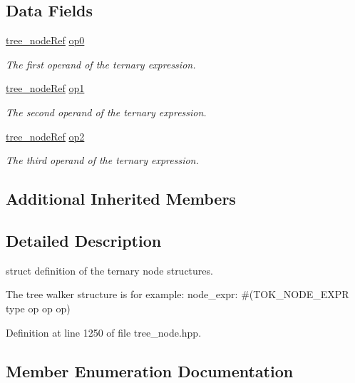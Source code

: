 \subsection*{Data Fields}
\begin{DoxyCompactItemize}
\item 
\hyperlink{tree__node_8hpp_a6ee377554d1c4871ad66a337eaa67fd5}{tree\+\_\+node\+Ref} \hyperlink{structternary__expr_a84c7843e200270533e0f6d919afd04c2}{op0}
\begin{DoxyCompactList}\small\item\em The first operand of the ternary expression. \end{DoxyCompactList}\item 
\hyperlink{tree__node_8hpp_a6ee377554d1c4871ad66a337eaa67fd5}{tree\+\_\+node\+Ref} \hyperlink{structternary__expr_ad67e5b5fdfe02673e426a8f9cc743ed3}{op1}
\begin{DoxyCompactList}\small\item\em The second operand of the ternary expression. \end{DoxyCompactList}\item 
\hyperlink{tree__node_8hpp_a6ee377554d1c4871ad66a337eaa67fd5}{tree\+\_\+node\+Ref} \hyperlink{structternary__expr_a55f515fdd2b6a3c150dfcfb4506a43ca}{op2}
\begin{DoxyCompactList}\small\item\em The third operand of the ternary expression. \end{DoxyCompactList}\end{DoxyCompactItemize}
\subsection*{Additional Inherited Members}


\subsection{Detailed Description}
struct definition of the ternary node structures. 

The tree walker structure is for example\+: node\+\_\+expr\+: \#(T\+O\+K\+\_\+\+N\+O\+D\+E\+\_\+\+E\+X\+PR type op op op) 

Definition at line 1250 of file tree\+\_\+node.\+hpp.



\subsection{Member Enumeration Documentation}
\mbox{\label{structternary__expr_acd7ceacf5cc8d02da11e025e6525b903}} 
